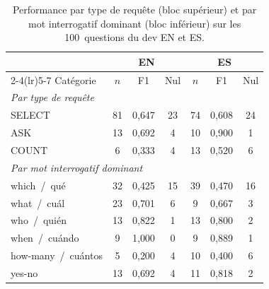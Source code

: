\documentclass[]{ceurart}
\begin{document}
\begin{table}[h]
\centering
\caption{Performance par type de requête (bloc supérieur) et par mot interrogatif dominant (bloc inférieur) sur les 100~questions du dev EN et ES.}
\label{tab:bytypeinterr}
\begin{tabular}{lcccccc}
\toprule
 & \multicolumn{3}{c}{EN} & \multicolumn{3}{c}{ES} \\
\cmidrule(lr){2-4}\cmidrule(lr){5-7}
Catégorie & $n$ & F1 & Nul & $n$ & F1 & Nul \\
\midrule
\multicolumn{7}{l}{\emph{Par type de requête}} \\
SELECT   & 81 & 0{,}647 & 23 & 74 & 0{,}608 & 24 \\
ASK      & 13 & 0{,}692 &  4 & 10 & 0{,}900 &  1 \\
COUNT    &  6 & 0{,}333 &  4 & 13 & 0{,}520 &  6 \\
\midrule
\multicolumn{7}{l}{\emph{Par mot interrogatif dominant}} \\
which~/~qué        & 32 & 0{,}425 & 15 & 39 & 0{,}470 & 16 \\
what~/~cuál        & 23 & 0{,}701 &  6 &  9 & 0{,}667 &  3 \\
who~/~quién        & 13 & 0{,}822 &  1 & 13 & 0{,}800 &  2 \\
when~/~cuándo      &  9 & 1{,}000 &  0 &  9 & 0{,}889 &  1 \\
how-many~/~cuántos &  5 & 0{,}200 &  4 & 10 & 0{,}400 &  6 \\
yes-no             & 13 & 0{,}692 &  4 & 11 & 0{,}818 &  2 \\
\bottomrule
\end{tabular}
\end{table}

\end{document}
